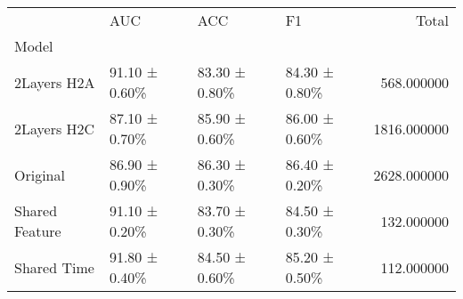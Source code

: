 \begin{tabular}{llllr}
\toprule
 & AUC & ACC & F1 & Total \\
Model &  &  &  &  \\
\midrule
2Layers H2A & 91.10 ± 0.60\% & 83.30 ± 0.80\% & 84.30 ± 0.80\% & 568.000000 \\
2Layers H2C & 87.10 ± 0.70\% & 85.90 ± 0.60\% & 86.00 ± 0.60\% & 1816.000000 \\
Original & 86.90 ± 0.90\% & 86.30 ± 0.30\% & 86.40 ± 0.20\% & 2628.000000 \\
Shared Feature & 91.10 ± 0.20\% & 83.70 ± 0.30\% & 84.50 ± 0.30\% & 132.000000 \\
Shared Time & 91.80 ± 0.40\% & 84.50 ± 0.60\% & 85.20 ± 0.50\% & 112.000000 \\
\bottomrule
\end{tabular}
